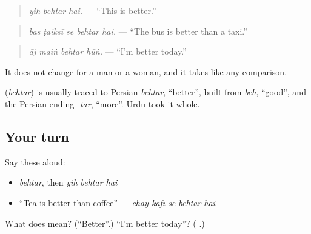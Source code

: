 \begin{quote}
\textbf{  }
\end{quote}

\begin{quote}
\emph{yih behtar hai.} — \textquotedblleft{}This is better.\textquotedblright{}
\end{quote}

\begin{quote}
\textbf{    }
\end{quote}

\begin{quote}
\emph{bas ṭaiksī se behtar hai.} — \textquotedblleft{}The bus is better than a taxi.\textquotedblright{}
\end{quote}

\begin{quote}
\textbf{   }
\end{quote}

\begin{quote}
\emph{āj maiṅ behtar hūṅ.} — \textquotedblleft{}I'm better today.\textquotedblright{}
\end{quote}

It does not change for a man or a woman, and it takes \textbf{} like any comparison.

\begin{cousinweb}
\textbf{} (\emph{behtar}) is usually traced to Persian \emph{behtar}, \textquotedblleft{}better\textquotedblright{}, built from \emph{beh}, \textquotedblleft{}good\textquotedblright{}, and the Persian ending \emph{-tar}, \textquotedblleft{}more\textquotedblright{}. Urdu took it whole.
\end{cousinweb}

\subsection*{Your turn}
Say these aloud:

\begin{itemize}
\raggedright
  \item \emph{behtar}, then \emph{yih behtar hai}
  \item \textquotedblleft{}Tea is better than coffee\textquotedblright{} — \emph{chāy kāfī se behtar hai}
\end{itemize}

\begin{tcolorbox}[breakable,colback=teal!4,colframe=teal!35!black,title={Before you move on}]
What does \textbf{} mean? (\textquotedblleft{}Better\textquotedblright{}.) \textquotedblleft{}I'm better today\textquotedblright{}? (\textbf{   }.)
\end{tcolorbox}
